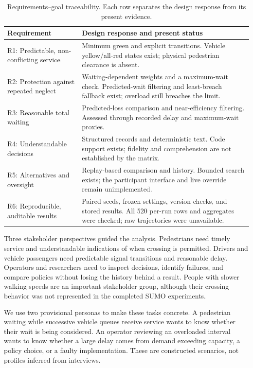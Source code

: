 \documentclass[sigconf]{acmart}
\begin{document}
\begin{table}[!htbp]
\caption{Requirements--goal traceability. Each row separates the design response from its present evidence.}
\label{tab:requirements}
\small
\renewcommand{\arraystretch}{1.12}
\begin{tabularx}{\columnwidth}{@{}>{\raggedright\arraybackslash}p{}Y@{}}
\toprule
Requirement & Design response and present status\\
\midrule
R1: Predictable, non-conflicting service &
Minimum green and explicit transitions. Vehicle yellow/all-red states exist; physical pedestrian clearance is absent.\\
\addlinespace[3pt]
R2: Protection against repeated neglect &
Waiting-dependent weights and a maximum-wait check. Predicted-wait filtering and least-breach fallback exist; overload still breaches the limit.\\
\addlinespace[3pt]
R3: Reasonable total waiting &
Predicted-loss comparison and near-efficiency filtering. Assessed through recorded delay and maximum-wait proxies.\\
\addlinespace[3pt]
R4: Understandable decisions &
Structured records and deterministic text. Code support exists; fidelity and comprehension are not established by the matrix.\\
\addlinespace[3pt]
R5: Alternatives and oversight &
Replay-based comparison and history. Bounded search exists; the participant interface and live override remain unimplemented.\\
\addlinespace[3pt]
R6: Reproducible, auditable results &
Paired seeds, frozen settings, version checks, and stored results. All 520 per-run rows and aggregates were checked; raw trajectories were unavailable.\\
\bottomrule
\end{tabularx}
\end{table}

Three stakeholder perspectives guided the analysis. Pedestrians need
timely service and understandable indications of when crossing is
permitted. Drivers and vehicle passengers need predictable signal
transitions and reasonable delay. Operators and researchers need to
inspect decisions, identify failures, and compare policies without
losing the history behind a result. People with slower walking speeds
are an important stakeholder group, although their crossing behavior
was not represented in the completed SUMO experiments.

We use two provisional personas to make these tasks concrete. A
pedestrian waiting while successive vehicle queues receive service
wants to know whether their wait is being considered. An operator
reviewing an overloaded interval wants to know whether a large delay
comes from demand exceeding capacity, a policy choice, or a faulty
implementation. These are constructed scenarios, not profiles inferred
from interviews.
\end{document}
